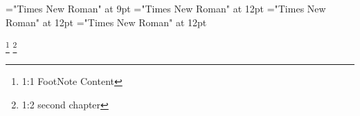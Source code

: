 \documentclass{article}
\begin{document}
 
\thispagestyle{empty} 
\font\footnotepsectionscriptureTextscrBody="Times New Roman" at 9pt
\font\psectionscriptureTextscrBody="Times New Roman" at 12pt
\font\sectionscriptureTextscrBody="Times New Roman" at 12pt
\font\scriptureTextscrBody="Times New Roman" at 12pt
\begin{adjustwidth}{12pt}{0pt}{12pt}{0pt}
  \footnote {1:1 FootNote Content }   \footnote {1:2 second chapter
                   } \end{adjustwidth} 
\end{document}
